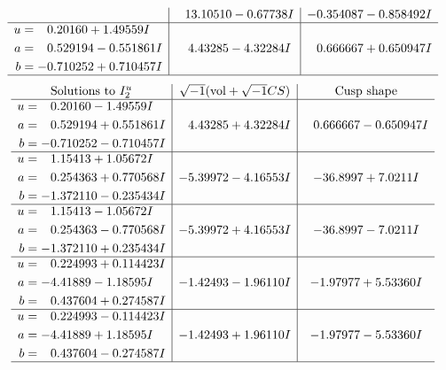 \documentclass[1p]{elsarticle_modified}
\theoremstyle{definition}
\newcommand{\I}{\sqrt{-1}}
\begin{document}
$$\begin{array}{c|c|c}
 & \phantom{-}13.10510 - 0.67738 I & -0.354087 - 0.858492 I \\ \hline\begin{aligned}
u &= \phantom{-}0.20160 + 1.49559 I \\
a &= \phantom{-}0.529194 - 0.551861 I \\
b &= -0.710252 + 0.710457 I\end{aligned}
 & \phantom{-}4.43285 - 4.32284 I & \phantom{-}0.666667 + 0.650947 I\\
 \hline 
 \end{array}$$\newpage$$\begin{array}{c|c|c}  
\text{Solutions to }I^u_{2}& \I (\text{vol} + \sqrt{-1}CS) & \text{Cusp shape}\\
 \hline 
\begin{aligned}
u &= \phantom{-}0.20160 - 1.49559 I \\
a &= \phantom{-}0.529194 + 0.551861 I \\
b &= -0.710252 - 0.710457 I\end{aligned}
 & \phantom{-}4.43285 + 4.32284 I & \phantom{-}0.666667 - 0.650947 I \\ \hline\begin{aligned}
u &= \phantom{-}1.15413 + 1.05672 I \\
a &= \phantom{-}0.254363 + 0.770568 I \\
b &= -1.372110 - 0.235434 I\end{aligned}
 & -5.39972 - 4.16553 I & -36.8997 + 7.0211 I \\ \hline\begin{aligned}
u &= \phantom{-}1.15413 - 1.05672 I \\
a &= \phantom{-}0.254363 - 0.770568 I \\
b &= -1.372110 + 0.235434 I\end{aligned}
 & -5.39972 + 4.16553 I & -36.8997 - 7.0211 I \\ \hline\begin{aligned}
u &= \phantom{-}0.224993 + 0.114423 I \\
a &= -4.41889 - 1.18595 I \\
b &= \phantom{-}0.437604 + 0.274587 I\end{aligned}
 & -1.42493 - 1.96110 I & -1.97977 + 5.53360 I \\ \hline\begin{aligned}
u &= \phantom{-}0.224993 - 0.114423 I \\
a &= -4.41889 + 1.18595 I \\
b &= \phantom{-}0.437604 - 0.274587 I\end{aligned}
 & -1.42493 + 1.96110 I & -1.97977 - 5.53360 I\\
 \hline 
 \end{array}$$\newpage
\end{document}
